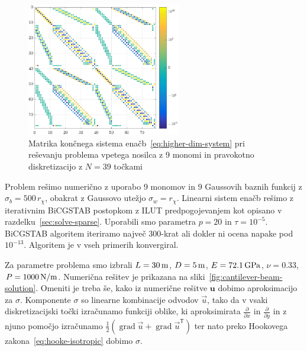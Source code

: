 \documentclass[12pt,a4paper,twoside]{article}
\theoremstyle{definition} %
\theoremstyle{plain} %
\numberwithin{equation}{section}
\newcommand{\T}{\mathsf{T}}
\newcommand{\grad}{\operatorname{grad}}
\renewcommand{\b}{\boldsymbol}
\newcommand{\dpar}[2]{\ensuremath{\frac{\partial #1}{\partial #2}}}
\newcommand{\vu}{\vec{u}}
\newcommand{\ts}{\sigma}
\begin{document}
\begin{figure}[!h]
  \centering
  \includegraphics[width=0.6\textwidth]{images/cantilever_beam_matrix_example.pdf}
  \caption[Matrika sistema enačb pri reševanju problema vpetega
  nosilca.]{Matrika končnega sistema enačb~\eqref{eq:higher-dim-system} pri
  reševanju problema vpetega nosilca z 9 monomi in pravokotno
  diskretizacijo z $N = 39$ točkami}
  \label{fig:cantilever-beam-matrix}
\end{figure}

Problem rešimo numerično z uporabo 9 monomov in 9 Gaussovih baznih funkcij z $\sigma_b =
500\,r_\chi$, obakrat z Gaussovo utežjo $\sigma_w = r_\chi$.
Linearni sistem enačb rešimo z iterativnim BiCGSTAB postopkom z ILUT predpogojevanjem
kot opisano v razdelku~\ref{sec:solve-sparse}. Uporabili smo parametra $p=20$ in $\tau = 10^{-5}$.
BiCGSTAB algoritem iteriramo največ 300-krat ali dokler ni ocena napake pod $10^{-13}$.
Algoritem je v vseh primerih konvergiral.

Za parametre problema smo izbrali $L = \unit[30]{m}$, $D = \unit[5]{m}$, $E = \unit[72.1]{GPa}$,
$\nu = 0.33$, $P = \unit[1000]{N/m}$. Numerična rešitev je prikazana na
sliki~\ref{fig:cantilever-beam-solution}. Omeniti je treba še, kako iz numerične rešitve $\b{u}$
dobimo aproksimacijo za $\ts$. Komponente $\ts$ so linearne kombinacije odvodov $\vu$, tako da v
vsaki diskretizacijski točki izračunamo funkciji oblike, ki aproksimirata $\dpar{}{x}$ in
$\dpar{}{y}$ in z njuno pomočjo izračunamo $\frac12 (\grad\vu + \grad\vu^\T)$ ter nato preko
Hookovega zakona~\eqref{eq:hooke-isotropic} dobimo $\ts$.
\end{document}
